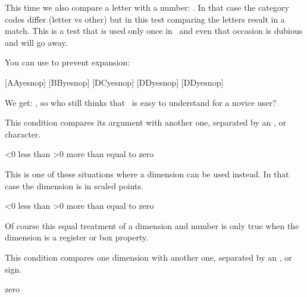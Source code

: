 \stopbuffer

\typebuffer[option=TEX]

This time we also compare a letter with a number: \inlinebuffer . In that case
the category codes differ (letter vs other) but in this test comparing the
letters result in a match. This is a test that is used only once in \CONTEXT\ and
even that occasion is dubious and will go away.

You can use \type {\noexpand} to prevent expansion:

\startbuffer
\def\A{A}%
\let\B B%
\def\C{D}%
\let\D D%
[\ifcat\noexpand\A Ayes\else nop\fi]
[\ifcat\noexpand\B Byes\else nop\fi]
[\ifcat\noexpand\C Cyes\else nop\fi]
[\ifcat\noexpand\C Dyes\else nop\fi]
[\ifcat\noexpand\D Dyes\else nop\fi]
\stopbuffer

\typebuffer[option=TEX]

We get: \inlinebuffer, so who still thinks that \TEX\ is easy to understand for a
novice user?

\stopsectionlevel

\startsectionlevel[title={\tex{ifnum}}]

This condition compares its argument with another one, separated by an \type {<},
\type {=} or \type {>} character.

\starttyping[option=TEX]
\ifnum\scratchcounter<0
    less than
\else\ifnum\scratchcounter>0
    more than
\else
    equal to
\fi zero
\stoptyping

This is one of these situations where a dimension can be used instead. In that
case the dimension is in scaled points.

\starttyping[option=TEX]
\ifnum\scratchdimen<0
    less than
\else\ifnum\scratchdimen>0
    more than
\else
    equal to
\fi zero
\stoptyping

Of course this equal treatment of a dimension and number is only true when the
dimension is a register or box property.

\stopsectionlevel

\startsectionlevel[title={\tex{ifdim}}]

This condition compares one dimension with another one, separated by an \type {<},
\type {=} or \type {>} sign.

\starttyping[option=TEX]
\ifdim\scratchdimen<0pt
    less than
\else\ifdim\scratchdimen>0pt
    more than
\else
    equal to
\fi zero
\stoptyping

